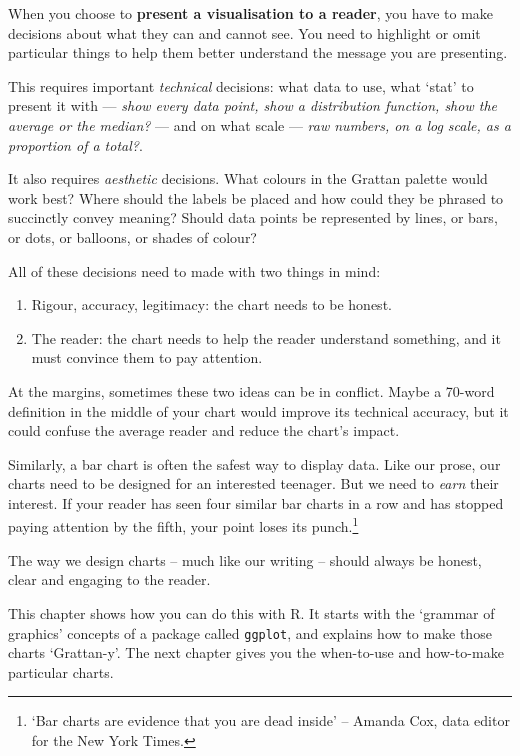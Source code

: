 \documentclass[
]{book}
\providecommand{\tightlist}{%
  \setlength{\itemsep}{0pt}\setlength{\parskip}{0pt}}
\begin{document}
When you choose to \textbf{present a visualisation to a reader}, you have to make decisions about what they can and cannot see. You need to highlight or omit particular things to help them better understand the message you are presenting.

This requires important \emph{technical} decisions: what data to use, what `stat' to present it with --- \emph{show every data point, show a distribution function, show the average or the median?} --- and on what scale --- \emph{raw numbers, on a log scale, as a proportion of a total?}.

It also requires \emph{aesthetic} decisions. What colours in the Grattan palette would work best? Where should the labels be placed and how could they be phrased to succinctly convey meaning? Should data points be represented by lines, or bars, or dots, or balloons, or shades of colour?

All of these decisions need to made with two things in mind:

\begin{enumerate}
\def\labelenumi{\arabic{enumi}.}
\tightlist
\item
  Rigour, accuracy, legitimacy: the chart needs to be honest.
\item
  The reader: the chart needs to help the reader understand something, and it must convince them to pay attention.
\end{enumerate}

At the margins, sometimes these two ideas can be in conflict. Maybe a 70-word definition in the middle of your chart would improve its technical accuracy, but it could confuse the average reader and reduce the chart's impact.

Similarly, a bar chart is often the safest way to display data. Like our prose, our charts need to be designed for an interested teenager. But we need to \emph{earn} their interest. If your reader has seen four similar bar charts in a row and has stopped paying attention by the fifth, your point loses its punch.\footnote{`Bar charts are evidence that you are dead inside' -- Amanda Cox, data editor for the New York Times.}

The way we design charts -- much like our writing -- should always be honest, clear and engaging to the reader.

This chapter shows how you can do this with R. It starts with the `grammar of graphics' concepts of a package called \texttt{ggplot}, and explains how to make those charts `Grattan-y'. The next chapter gives you the when-to-use and how-to-make particular charts.
\end{document}
